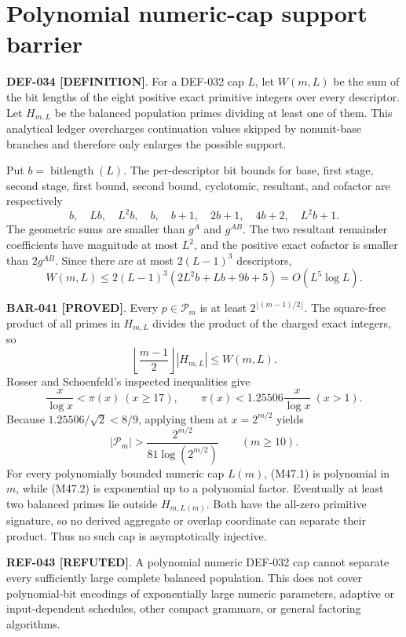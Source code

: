 \documentclass[11pt]{article}
\newcommand{\claimstatus}[2]{\textbf{#1 [#2]}}
\begin{document}
\section{Polynomial numeric-cap support barrier}

\claimstatus{DEF-034}{DEFINITION}. For a DEF-032 cap \(L\), let \(W(m,L)\)
be the sum of the bit lengths of the eight positive exact primitive integers
over every descriptor. Let \(H_{m,L}\) be the balanced population primes
dividing at least one of them. This analytical ledger overcharges
continuation values skipped by nonunit-base branches and therefore only
enlarges the possible support.

Put \(b=\operatorname{bitlength}(L)\). The per-descriptor bit bounds for
base, first stage, second stage, first bound, second bound, cyclotomic,
resultant, and cofactor are respectively
\[
b,\quad Lb,\quad L^2b,\quad b,\quad b+1,\quad
2b+1,\quad4b+2,\quad L^2b+1.
\]
The geometric sums are smaller than \(g^A\) and \(g^{AB}\). The two
resultant remainder coefficients have magnitude at most \(L^2\), and the
positive exact cofactor is smaller than \(2g^{AB}\). Since there are at most
\(2(L-1)^3\) descriptors,
\[
W(m,L)\le
2(L-1)^3(2L^2b+Lb+9b+5)
=O(L^5\log L).
\tag{M47.1}
\]

\claimstatus{BAR-041}{PROVED}. Every \(p\in\mathcal P_m\) is at least
\(2^{\lfloor(m-1)/2\rfloor}\). The square-free product of all primes in
\(H_{m,L}\) divides the product of the charged exact integers, so
\[
\left\lfloor\frac{m-1}{2}\right\rfloor |H_{m,L}|
\le W(m,L).
\]
Rosser and Schoenfeld's inspected inequalities
\cite{rosser1962approximate} give
\[
\frac{x}{\log x}<\pi(x)\ (x\ge17),\qquad
\pi(x)<1.25506\frac{x}{\log x}\ (x>1).
\]
Because \(1.25506/\sqrt2<8/9\), applying them at
\(x=2^{m/2}\) yields
\[
|\mathcal P_m|>
\frac{2^{m/2}}{81\log(2^{m/2})}
\qquad(m\ge10).
\tag{M47.2}
\]
For every polynomially bounded numeric cap \(L(m)\), (M47.1) is polynomial in
\(m\), while (M47.2) is exponential up to a polynomial factor. Eventually at
least two balanced primes lie outside \(H_{m,L(m)}\). Both have the all-zero
primitive signature, so no derived aggregate or overlap coordinate can
separate their product. Thus no such cap is asymptotically injective.

\claimstatus{REF-043}{REFUTED}. A polynomial numeric DEF-032 cap cannot
separate every sufficiently large complete balanced population. This does
not cover polynomial-bit encodings of exponentially large numeric
parameters, adaptive or input-dependent schedules, other compact grammars,
or general factoring algorithms.
\end{document}
